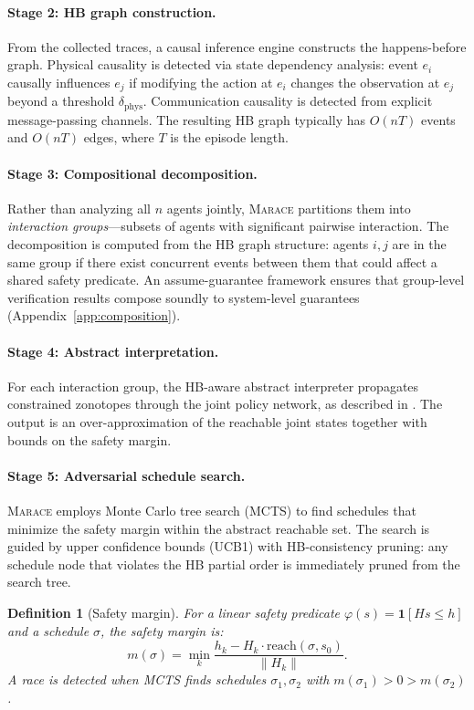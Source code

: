 \documentclass[11pt]{article}
\newtheorem{definition}[theorem]{Definition}
\newcommand{\norm}[1]{\lVert #1 \rVert}
\newcommand{\marace}{\textsc{Marace}}
\begin{document}
\paragraph{Stage 2: HB graph construction.}
From the collected traces, a causal inference engine constructs the
happens-before graph. Physical causality is detected via state dependency
analysis: event $e_i$ causally influences $e_j$ if modifying the action
at $e_i$ changes the observation at $e_j$ beyond a threshold $\delta_{\text{phys}}$.
Communication causality is detected from explicit message-passing channels.
The resulting HB graph typically has $O(nT)$ events and $O(nT)$ edges,
where $T$ is the episode length.

\paragraph{Stage 3: Compositional decomposition.}
Rather than analyzing all $n$ agents jointly, \marace{} partitions them
into \emph{interaction groups}---subsets of agents with significant
pairwise interaction. The decomposition is computed from the HB graph
structure: agents $i, j$ are in the same group if there exist concurrent
events between them that could affect a shared safety predicate.
An assume-guarantee framework ensures that group-level verification
results compose soundly to system-level guarantees (Appendix~\ref{app:composition}).

\paragraph{Stage 4: Abstract interpretation.}
For each interaction group, the HB-aware abstract interpreter propagates
constrained zonotopes through the joint policy network, as described in
. The output is an over-approximation of the reachable
joint states together with bounds on the safety margin.

\paragraph{Stage 5: Adversarial schedule search.}
\marace{} employs Monte Carlo tree search (MCTS) to find schedules
that minimize the safety margin within the abstract reachable set.
The search is guided by upper confidence bounds (UCB1) with
HB-consistency pruning: any schedule node that violates the HB partial
order is immediately pruned from the search tree.

\begin{definition}[Safety margin]
\label{def:margin}
For a linear safety predicate $\varphi(s) = \mathbf{1}[Hs \leq h]$ and
a schedule $\sigma$, the \emph{safety margin} is:
\[
  m(\sigma) = \min_{k} \frac{h_k - H_k \cdot \mathrm{reach}(\sigma, s_0)}{\norm{H_k}}.
\]
A race is detected when MCTS finds schedules $\sigma_1, \sigma_2$ with
$m(\sigma_1) > 0 > m(\sigma_2)$.
\end{definition}
\end{document}
